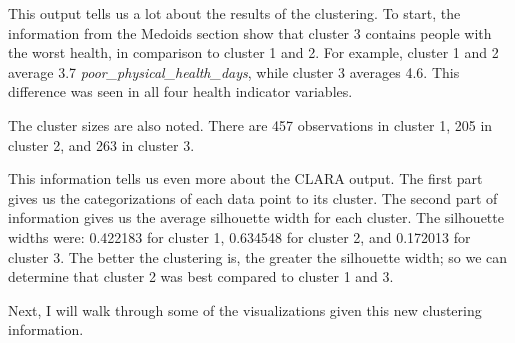 \documentclass[12pt,twoside]{amherstthesis}
\begin{document}
  This output tells us a lot about the results of the clustering. To
  start, the information from the Medoids section show that cluster 3
  contains people with the worst health, in comparison to cluster 1 and 2.
  For example, cluster 1 and 2 average 3.7
  \emph{poor\_physical\_health\_days}, while cluster 3 averages 4.6. This
  difference was seen in all four health indicator variables.
  
  The cluster sizes are also noted. There are 457 observations in cluster
  1, 205 in cluster 2, and 263 in cluster 3.
  
  \begin{Shaded}
  \begin{Highlighting}[]
  \OperatorTok{$}
  \OperatorTok{$}
  \end{Highlighting}
  \end{Shaded}
  
  This information tells us even more about the CLARA output. The first
  part gives us the categorizations of each data point to its cluster. The
  second part of information gives us the average silhouette width for
  each cluster. The silhouette widths were: 0.422183 for cluster 1,
  0.634548 for cluster 2, and 0.172013 for cluster 3. The better the
  clustering is, the greater the silhouette width; so we can determine
  that cluster 2 was best compared to cluster 1 and 3.
  
  Next, I will walk through some of the visualizations given this new
  clustering information.
  
  \begin{Shaded}
  \begin{Highlighting}[]
  \OperatorTok{$}
  \OperatorTok{$} \OperatorTok{:}\NormalTok{, } \NormalTok{)}
  \end{Highlighting}
  \end{Shaded}
  
\end{document}
